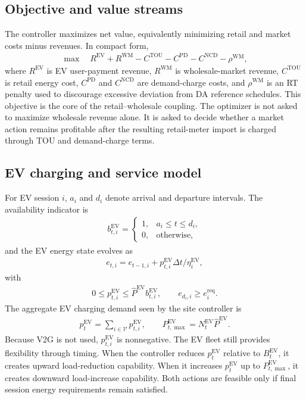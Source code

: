 \documentclass[final,5p,times]{elsarticle}
\newcommand{\DeltaT}{\Delta t}
\newcommand{\EV}{\mathrm{EV}}
\newcommand{\TOU}{\mathrm{TOU}}
\newcommand{\PD}{\mathrm{PD}}
\newcommand{\NCD}{\mathrm{NCD}}
\newcommand{\WM}{\mathrm{WM}}
\newcommand{\req}{\mathrm{req}}
\newcommand{\calV}{\mathcal{V}}
\begin{document}
\subsection{Objective and value streams}

The controller maximizes net value, equivalently minimizing retail and market costs minus revenues. In compact form,
\begin{align}
\max \quad R^{\EV}+R^{\WM}-C^{\TOU}-C^{\PD}-C^{\NCD}-\rho^{\WM},
\label{eq:objective_compact}
\end{align}
where $R^{\EV}$ is EV user-payment revenue, $R^{\WM}$ is wholesale-market revenue, $C^{\TOU}$ is retail energy cost, $C^{\PD}$ and $C^{\NCD}$ are demand-charge costs, and $\rho^{\WM}$ is an RT penalty used to discourage excessive deviation from DA reference schedules. This objective is the core of the retail--wholesale coupling. The optimizer is not asked to maximize wholesale revenue alone. It is asked to decide whether a market action remains profitable after the resulting retail-meter import is charged through TOU and demand-charge terms.

\subsection{EV charging and service model}

For EV session $i$, $a_i$ and $d_i$ denote arrival and departure intervals. The availability indicator is
\begin{align}
b_{t,i}^{\EV}=\begin{cases}
1, & a_i\le t\le d_i,\\
0, & \text{otherwise},
\end{cases}
\label{eq:ev_availability}
\end{align}
and the EV energy state evolves as
\begin{align}
e_{t,i}=e_{t-1,i}+p_{t,i}^{\EV}\DeltaT/\eta_i^{\EV},
\label{eq:ev_dynamics_main}
\end{align}
with
\begin{align}
0\le p_{t,i}^{\EV}\le \hat P^{\EV}b_{t,i}^{\EV},\qquad e_{d_i,i}\ge e_i^{\req}.
\label{eq:ev_limits_main}
\end{align}
The aggregate EV charging demand seen by the site controller is
\begin{align}
p_t^{\EV}=\sum_{i\in\calV}p_{t,i}^{\EV},\qquad P_{t,\max}^{\EV}=N_t^{\EV}\hat P^{\EV}.
\label{eq:ev_aggregate_main}
\end{align}
Because V2G is not used, $p_{t,i}^{\EV}$ is nonnegative. The EV fleet still provides flexibility through timing. When the controller reduces $p_t^{\EV}$ relative to $B_t^{\EV}$, it creates upward load-reduction capability. When it increases $p_t^{\EV}$ up to $P_{t,\max}^{\EV}$, it creates downward load-increase capability. Both actions are feasible only if final session energy requirements remain satisfied.
\end{document}
